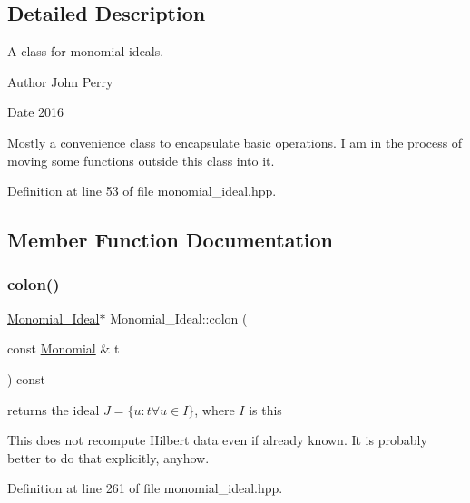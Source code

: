 \subsection{Detailed Description}
A class for monomial ideals. 

\begin{DoxyAuthor}{Author}
John Perry 
\end{DoxyAuthor}
\begin{DoxyDate}{Date}
2016
\end{DoxyDate}
Mostly a convenience class to encapsulate basic operations. I am in the process of moving some functions outside this class into it. 

Definition at line 53 of file monomial\+\_\+ideal.\+hpp.



\subsection{Member Function Documentation}
\mbox{\label{class_monomial___ideal_a708f7bc64b3e5d5ac3ea8e3b0cb15769}} 
\subsubsection{\texorpdfstring{colon()}{colon()}}
{\footnotesize\ttfamily \hyperlink{class_monomial___ideal}{Monomial\+\_\+\+Ideal}$\ast$ Monomial\+\_\+\+Ideal\+::colon (\begin{DoxyParamCaption}\item[{const \hyperlink{class_monomial}{Monomial} \&}]{t }\end{DoxyParamCaption}) const\hspace{0.3cm}{\ttfamily [inline]}}



returns the ideal $J=\{u:t \forall u\in I\}$, where $I$ is {\ttfamily this} 

This does not recompute Hilbert data even if already known. It is probably better to do that explicitly, anyhow. 

Definition at line 261 of file monomial\+\_\+ideal.\+hpp.

\mbox{\label{class_monomial___ideal_a2ae67955874f0a461952a89f6fb25647}} 
